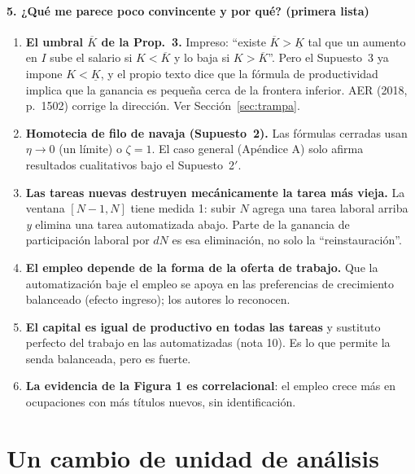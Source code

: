 \documentclass[11pt,a4paper]{article}
\theoremstyle{definition}
\theoremstyle{plain}
\theoremstyle{remark}
\numberwithin{equation}{section}
\newcommand{\Kl}{\underline K}
\newcommand{\Kb}{\overline K}
\begin{document}
\paragraph{5. ¿Qué me parece poco convincente y por qué? (primera lista)}
\begin{enumerate}[nosep,label=(\alph*)]
  \item \textbf{El umbral $\Kb$ de la Prop.~3.} Impreso: ``existe $\Kb>\Kl$ tal que un aumento en $I$ sube el salario
        si $K<\Kb$ y lo baja si $K>\Kb$''. Pero el Supuesto~3 ya impone $K<\Kl$, y el propio texto dice que la
        fórmula de productividad implica que la ganancia es pequeña cerca de la frontera inferior. AER (2018, p.~1502) corrige la dirección. Ver
        Sección~\ref{sec:trampa}.
  \item \textbf{Homotecia de filo de navaja (Supuesto~2).} Las fórmulas cerradas usan $\eta\to0$ (un límite) o
        $\zeta=1$. El caso general (Apéndice A) solo afirma resultados cualitativos bajo el Supuesto~2$'$.
  \item \textbf{Las tareas nuevas destruyen mecánicamente la tarea más vieja.} La ventana $[N-1,N]$ tiene medida 1:
        subir $N$ agrega una tarea laboral arriba \emph{y} elimina una tarea automatizada abajo. Parte de la ganancia
        de participación laboral por $dN$ es esa eliminación, no solo la ``reinstauración''.
  \item \textbf{El empleo depende de la forma de la oferta de trabajo.} Que la automatización baje el empleo se apoya
        en las preferencias de crecimiento balanceado (efecto ingreso); los autores lo reconocen.
  \item \textbf{El capital es igual de productivo en todas las tareas} y sustituto perfecto del trabajo en las
        automatizadas (nota 10). Es lo que permite la senda balanceada, pero es fuerte.
  \item \textbf{La evidencia de la Figura 1 es correlacional}: el empleo crece más en ocupaciones con más títulos
        nuevos, sin identificación.
\end{enumerate}

\section{Un cambio de unidad de análisis}
\end{document}
